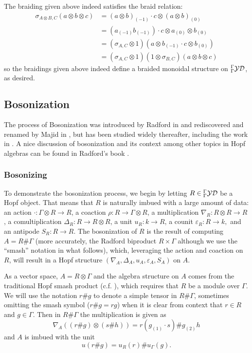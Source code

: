 \documentclass[12pt]{article}
\begin{document}
The braiding given above indeed satisfies the braid relation:
\begin{align*}
    \sigma_{A\otimes B,C}(a\otimes b\otimes c)&=(a\otimes b)_{(-1)}\cdot c\otimes (a\otimes b)_{(0)}\\
    &=(a_{(-1)}b_{(-1)})\cdot c\otimes a_{(0)}\otimes b_{(0)}\\
    &=(\sigma_{A,C}\otimes 1)(a\otimes b_{(-1)}\cdot c\otimes b_{(0)})\\
    &=(\sigma_{A,C}\otimes 1)(1\otimes\sigma_{B,C})(a\otimes b\otimes c)
\end{align*}
so the braidings given above indeed define a braided monoidal structure on ${^\Gamma_\Gamma\mathcal{YD}}$, as desired.

\subsection{Bosonization}
The process of Bosonization was introduced by Radford in \cite{radford-product} and rediscovered and renamed by Majid in \cite{majid-bosonization}, but has been studied widely thereafter, including the work in \cite{andruskiewitsch-schneider-lifting}. A nice discussion of bosonization and its context among other topics in Hopf algebras can be found in Radford's book \cite[chp. 11]{radford-book}.

\subsubsection{Bosonizing}
To demonstrate the bosonization process, we begin by letting $R\in{^\Gamma_\Gamma\mathcal{YD}}$ be a Hopf object. That means that $R$ is naturally imbued with a large amount of data: an action $\cdot:\Gamma\otimes R\to R$, a coaction $\rho:R\to \Gamma\otimes R$, a multiplication $\nabla_R:R\otimes R\to R$, a comultiplication $\Delta_R:R\to R\otimes R$, a unit $u_R:k\to R$, a counit $\varepsilon_R:R\to k,$ and an antipode $S_R:R\to R$. The bosonization of $R$ is the result of computing $A=R\#\Gamma$ (more accurately, the Radford biproduct $R\times \Gamma$ although we use the ``smash'' notation in what follows), which, leveraging the action and coaction on $R$, will result in a Hopf structure $(\nabla_A,\Delta_A,u_A,\varepsilon_A,S_A)$ on $A$.

As a vector space, $A=R\otimes \Gamma$ and the algebra structure on $A$ comes from the traditional Hopf smash product (c.f. \cite{montgomery}), which requires that $R$ be a module over $\Gamma$. We will use the notation $r\# g$ to denote a simple tensor in $R\# \Gamma$, sometimes omitting the smash symbol ($r\#g=rg$) when it is clear from context that $r\in R$ and $g\in \Gamma.$ Then in $R\#\Gamma$ the multiplication is given as
\[\nabla_A((r\# g)\otimes (s\# h))=r(g_{(1)}\cdot s)\# g_{(2)}h\]
and $A$ is imbued with the unit
\[u(r\# g)=u_R(r)\# u_\Gamma(g).\]
\end{document}
